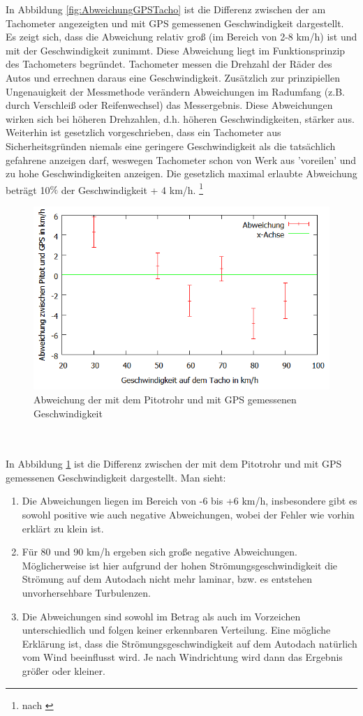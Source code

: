 In Abbildung \ref{fig:AbweichungGPSTacho} ist die Differenz zwischen der am Tachometer angezeigten und mit GPS gemessenen Geschwindigkeit dargestellt. Es zeigt sich, dass die Abweichung relativ groß (im Bereich von 2-8 km/h) ist und mit der Geschwindigkeit zunimmt. Diese Abweichung liegt im Funktionsprinzip des Tachometers begründet. Tachometer messen die Drehzahl der Räder des Autos und errechnen daraus eine Geschwindigkeit. Zusätzlich zur prinzipiellen Ungenauigkeit der Messmethode verändern Abweichungen im Radumfang (z.B. durch Verschleiß oder Reifenwechsel) das Messergebnis. Diese Abweichungen wirken sich bei höheren Drehzahlen, d.h. höheren Geschwindigkeiten, stärker aus. Weiterhin ist gesetzlich vorgeschrieben, dass ein Tachometer aus Sicherheitsgründen niemals eine geringere Geschwindigkeit als die tatsächlich gefahrene anzeigen darf, weswegen Tachometer schon von Werk aus 'voreilen' und zu hohe Geschwindigkeiten anzeigen. Die gesetzlich maximal erlaubte Abweichung beträgt 10$\%$ der Geschwindigkeit + 4 km/h.  \footnote{nach \cite{ho}}
\begin{figure}
      \includegraphics[width=.9\textwidth]{images/AbweichungGPSPitot}
\caption{Abweichung der mit dem Pitotrohr und mit GPS gemessenen Geschwindigkeit}
\label{fig:AbweichungGPSPitot}
\end{figure}
\\
\\
In Abbildung \ref{fig:AbweichungGPSPitot} ist die Differenz zwischen der mit dem Pitotrohr und mit GPS gemessenen Geschwindigkeit dargestellt. Man sieht:
\begin{enumerate}
\item Die Abweichungen liegen im Bereich von -6 bis +6 km/h, insbesondere gibt es sowohl positive wie auch negative Abweichungen, wobei der Fehler wie vorhin erklärt zu klein ist.
\item Für 80 und 90 km/h ergeben sich große negative Abweichungen. Möglicherweise ist hier aufgrund der hohen Strömungsgeschwindigkeit die Strömung auf dem Autodach nicht mehr laminar, bzw. es entstehen unvorhersehbare Turbulenzen.
\item Die Abweichungen sind sowohl im Betrag als auch im Vorzeichen unterschiedlich und folgen keiner erkennbaren Verteilung. Eine mögliche Erklärung ist, dass die Strömungsgeschwindigkeit auf dem Autodach natürlich vom Wind beeinflusst wird. Je nach Windrichtung wird dann das Ergebnis größer oder kleiner.
\end{enumerate}

